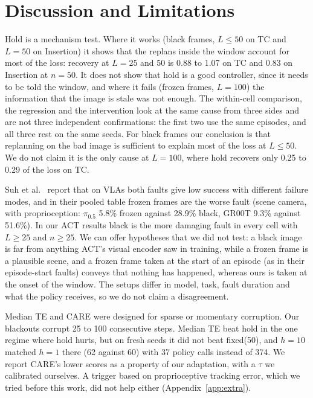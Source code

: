 \documentclass[11pt]{article}
\newcommand{\fixed}{\textsf{fixed}\xspace}
\begin{document}
\section{Discussion and Limitations}
\label{sec:discussion}

Hold is a mechanism test. Where it works (black frames, $L\le50$ on TC and $L{=}50$ on Insertion) it shows that the replans inside the window account for most of the loss: recovery at $L{=}25$ and 50 is 0.88 to 1.07 on TC and 0.83 on Insertion at $n{=}50$. It does not show that hold is a good controller, since it needs to be told the window, and where it fails (frozen frames, $L{=}100$) the information that the image is stale was not enough. The within-cell comparison, the regression and the intervention look at the same cause from three sides and are not three independent confirmations: the first two use the same episodes, and all three rest on the same seeds. For black frames our conclusion is that replanning on the bad image is sufficient to explain most of the loss at $L\le50$. We do not claim it is the only cause at $L{=}100$, where hold recovers only 0.25 to 0.29 of the loss on TC.

Suh et al.~\cite{suh2026blackout} report that on VLAs both faults give low success with different failure modes, and in their pooled table frozen frames are the worse fault (scene camera, with proprioception: $\pi_{0.5}$ 5.8\% frozen against 28.9\% black, GR00T 9.3\% against 51.6\%). In our ACT results black is the more damaging fault in every cell with $L\ge25$ and $n\ge25$. We can offer hypotheses that we did not test: a black image is far from anything ACT's visual encoder saw in training, while a frozen frame is a plausible scene, and a frozen frame taken at the start of an episode (as in their episode-start faults) conveys that nothing has happened, whereas ours is taken at the onset of the window. The setups differ in model, task, fault duration and what the policy receives, so we do not claim a disagreement.

Median TE and CARE were designed for sparse or momentary corruption. Our blackouts corrupt 25 to 100 consecutive steps. Median TE beat hold in the one regime where hold hurts, but on fresh seeds it did not beat \fixed(50), and $h{=}10$ matched $h{=}1$ there (62 against 60) with 37 policy calls instead of 374. We report CARE's lower scores as a property of our adaptation, with a $\tau$ we calibrated ourselves. A trigger based on proprioceptive tracking error, which we tried before this work, did not help either (Appendix~\ref{app:extra}).
\end{document}
